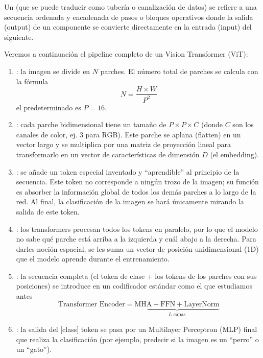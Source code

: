 \begin{observacion}
    Un  (que se puede traducir como tubería o canalización de datos) se refiere a una secuencia ordenada y encadenada de pasos o bloques operativos donde la salida (output) de un componente se convierte directamente en la entrada (input) del siguiente. \\
\end{observacion}

\noindent
Veremos a continuación el pipeline completo de un Vision Transformer (ViT):
\begin{enumerate}
    \item {}: la imagen se divide en $N$ parches. El número total de parches se calcula con la fórmula
    $$N = \frac{H \times W}{P^2}$$
    el predeterminado es $P=16$.
    \item {}: cada parche bidimensional tiene un tamaño de $P \times P \times C$ (donde $C$ son los canales de color, ej. 3 para RGB). Este parche se aplana (flatten) en un vector largo y se multiplica por una matriz de proyección lineal para transformarlo en un vector de características de dimensión $D$ (el embedding).
    \item {}: se añade un token especial inventado y ``aprendible'' al principio de la secuencia. Este token no corresponde a ningún trozo de la imagen; su función es absorber la información global de todos los demás parches a lo largo de la red. Al final, la clasificación de la imagen se hará únicamente mirando la salida de este token.
    \item {}: los transformers procesan todos los tokens en paralelo, por lo que el modelo no sabe qué parche está arriba a la izquierda y cuál abajo a la derecha. Para darles noción espacial, se les suma un vector de posición unidimensional (1D) que el modelo aprende durante el entrenamiento.
    \item {}: la secuencia completa (el token de clase + los tokens de los parches con sus posiciones) se introduce en un codificador estándar como el que estudiamos antes
    \begin{equation*}
        \text{Transformer Encoder} = \underbrace{\text{MHA} + \text{FFN} + \text{LayerNorm}}_{L \text{ capas}}
    \end{equation*}
    \item {}: la salida del [class] token se pasa por un Multilayer Perceptron (MLP) final que realiza la clasificación (por ejemplo, predecir si la imagen es un ``perro'' o un ``gato'').
\end{enumerate}

